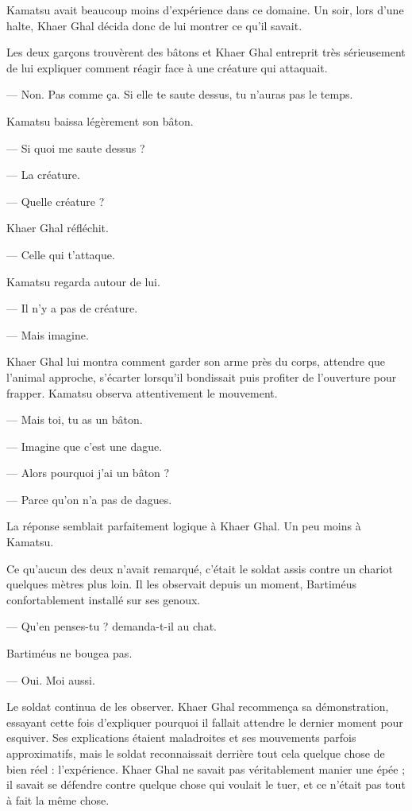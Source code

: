 Kamatsu avait beaucoup moins d'expérience dans ce domaine. Un soir, lors d'une
halte, Khaer Ghal décida donc de lui montrer ce qu'il savait.

Les deux garçons trouvèrent des bâtons et Khaer Ghal entreprit très sérieusement
de lui expliquer comment réagir face à une créature qui attaquait.

— Non. Pas comme ça. Si elle te saute dessus, tu n'auras pas le temps.

Kamatsu baissa légèrement son bâton.

— Si quoi me saute dessus ?

— La créature.

— Quelle créature ?

Khaer Ghal réfléchit.

— Celle qui t'attaque.

Kamatsu regarda autour de lui.

— Il n'y a pas de créature.

— Mais imagine.

Khaer Ghal lui montra comment garder son arme près du corps, attendre que
l'animal approche, s'écarter lorsqu'il bondissait puis profiter de l'ouverture
pour frapper. Kamatsu observa attentivement le mouvement.

— Mais toi, tu as un bâton.

— Imagine que c'est une dague.

— Alors pourquoi j'ai un bâton ?

— Parce qu'on n'a pas de dagues.

La réponse semblait parfaitement logique à Khaer Ghal. Un peu moins à Kamatsu.

Ce qu'aucun des deux n'avait remarqué, c'était le soldat assis contre un chariot
quelques mètres plus loin. Il les observait depuis un moment, Bartiméus
confortablement installé sur ses genoux.

— Qu'en penses-tu ? demanda-t-il au chat.

Bartiméus ne bougea pas.

— Oui. Moi aussi.

Le soldat continua de les observer. Khaer Ghal recommença sa démonstration,
essayant cette fois d'expliquer pourquoi il fallait attendre le dernier moment
pour esquiver. Ses explications étaient maladroites et ses mouvements parfois
approximatifs, mais le soldat reconnaissait derrière tout cela quelque chose de
bien réel : l'expérience. Khaer Ghal ne savait pas véritablement manier une
épée ; il savait se défendre contre quelque chose qui voulait le tuer, et ce
n'était pas tout à fait la même chose.

